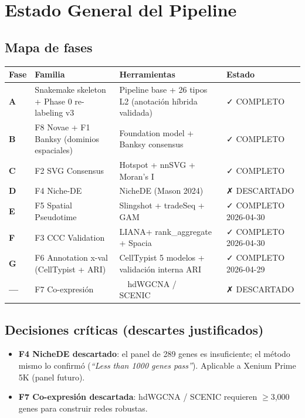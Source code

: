 \documentclass[11pt,a4paper]{article}
\begin{document}
\newpage
\tableofcontents
\newpage

\section{Estado General del Pipeline}

\subsection{Mapa de fases}

\begin{longtable}{|>{\bfseries}p{1cm}|p{4cm}|p{6.5cm}|p{2.5cm}|}
\hline
\rowcolor{lightgray}\textbf{Fase} & \textbf{Familia} & \textbf{Herramientas} & \textbf{Estado} \\
\hline
A & Snakemake skeleton + Phase 0 re-labeling v3 & Pipeline base + 26 tipos L2 (anotación híbrida validada) & \textcolor{mgreen}{✓ COMPLETO} \\
\hline
B & F8 Novae + F1 Banksy (dominios espaciales) & Foundation model + Banksy consensus & \textcolor{mgreen}{✓ COMPLETO} \\
\hline
C & F2 SVG Consensus & Hotspot + nnSVG + Moran's I & \textcolor{mgreen}{✓ COMPLETO} \\
\hline
D & F4 Niche-DE & NicheDE (Mason 2024) & \textcolor{morange}{✗ DESCARTADO} \\
\hline
E & F5 Spatial Pseudotime & Slingshot + tradeSeq + GAM & \textcolor{mgreen}{✓ COMPLETO 2026-04-30} \\
\hline
F & F3 CCC Validation & LIANA+ rank\_aggregate + Spacia & \textcolor{mgreen}{✓ COMPLETO 2026-04-30} \\
\hline
G & F6 Annotation x-val (CellTypist + ARI) & CellTypist 5 modelos + validación interna ARI & \textcolor{mgreen}{✓ COMPLETO 2026-04-29} \\
\hline
--- & F7 Co-expresión & ~~hdWGCNA / SCENIC~~ & \textcolor{morange}{✗ DESCARTADO} \\
\hline
\end{longtable}

\subsection{Decisiones críticas (descartes justificados)}

\begin{itemize}[leftmargin=*]
\item \textbf{F4 NicheDE descartado}: el panel de 289 genes es insuficiente; el método mismo lo confirmó (\textit{``Less than 1000 genes pass''}). Aplicable a Xenium Prime 5K (panel futuro).
\item \textbf{F7 Co-expresión descartada}: hdWGCNA / SCENIC requieren $\geq$3{,}000 genes para construir redes robustas.
\end{itemize}
\end{document}
